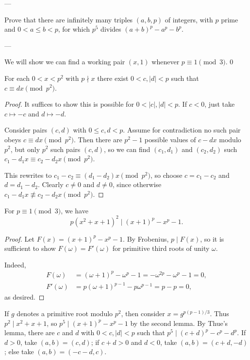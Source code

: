 
---

Prove that there are infinitely many triples $(a,b,p)$ of integers, with $p$ prime and $0<a\le b<p$, for which $p^5$ divides $(a+b)^p-a^p-b^p$.

---

We will show we can find a working pair $(x,1)$ whenever $p\equiv1\pmod3$.
\setcounter{boxlemma}0
\begin{boxlemma}
    For each $0<x<p^2$ with $p\nmid x$ there exist $0<c,|d|<p$ such that $c\equiv dx\pmod{p^2}$.
\end{boxlemma}
\begin{proof}
    It suffices to show this is possible for $0<|c|,|d|<p$. If $c<0$, just take $c\mapsto-c$ and $d\mapsto-d$.

    Consider pairs $(c,d)$ with $0\le c,d<p$. Assume for contradiction no such pair obeys $c\equiv dx\pmod{p^2}$. Then there are $p^2-1$ possible values of $c-dx$ modulo $p^2$, but only $p^2$ such pairs $(c,d)$, so we can find $(c_1,d_1)$ and $(c_2,d_2)$ such $c_1-d_1x\equiv c_2-d_2x\pmod{p^2}$.

    This rewrites to $c_1-c_2\equiv(d_1-d_2)x\pmod{p^2}$, so choose $c=c_1-c_2$ and $d=d_1-d_2$. Clearly $c\ne0$ and $d\ne0$, since otherwise $c_1-d_1x\not\equiv c_2-d_2x\pmod{p^2}$.
\end{proof}
\begin{boxlemma}
    For $p\equiv1\pmod3$, we have\[p\left(x^2+x+1\right)^2\mid(x+1)^p-x^p-1.\]
\end{boxlemma}
\begin{proof}
    Let $F(x)=(x+1)^p-x^p-1$. By Frobenius, $p\mid F(x)$, so it is sufficient to show $F(\omega)=F'(\omega)$ for primitive third roots of unity $\omega$.

    Indeed,
    \begin{align*}
        F(\omega)&=(\omega+1)^p-\omega^p-1=-\omega^{2p}-\omega^p-1=0,\\
        F'(\omega)&=p(\omega+1)^{p-1}-p\omega^{p-1}=p-p=0,
    \end{align*}
    as desired.
\end{proof}

If $g$ denotes a primitive root modulo $p^2$, then consider $x=g^{p(p-1)/3}$. Thus $p^2\mid x^2+x+1$, so $p^5\mid(x+1)^p-x^p-1$ by the second lemma. By Thue's lemma, there are $c$ and $d$ with $0<c,|d|<p$ such that $p^5\mid(c+d)^p-c^p-d^p$. If $d>0$, take $(a,b)=(c,d)$; if $c+d>0$ and $d<0$, take $(a,b)=(c+d,-d)$; else take $(a,b)=(-c-d,c)$.


